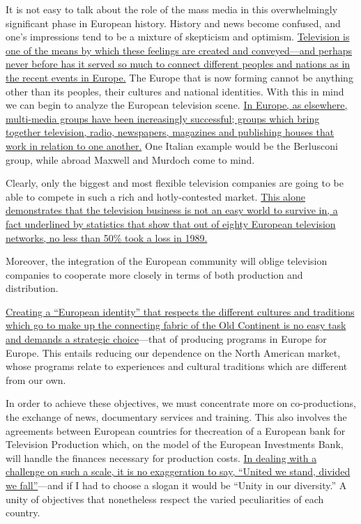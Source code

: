 {It is not easy to talk about the role of the mass media in this
overwhelmingly significant phase in European history. History and news
become confused, and one's impressions tend to be a mixture of
skepticism and optimism. \transnum \uline{Television is one of the means
	by which these feelings are created and conveyed---and perhaps never
	before has it served so much to connect different peoples and nations as
	in the recent events in Europe.} The Europe that is now forming cannot
be anything other than its peoples, their cultures and national
identities. With this in mind we can begin to analyze the European
television scene. \transnum \uline{In Europe, as elsewhere, multi-media
	groups have been increasingly successful; groups which bring together
	television, radio, newspapers, magazines and publishing houses that work
	in relation to one another.} One Italian example would be the Berlusconi
group, while abroad Maxwell and Murdoch come to mind.

Clearly, only the biggest and most flexible television companies are
going to be able to compete in such a rich and hotly-contested market.
\transnum \uline{This alone demonstrates that the television business is
	not an easy world to survive in, a fact underlined by statistics that
	show that out of eighty European television networks, no less than 50\%
	took a loss in 1989.}

Moreover, the integration of the European community will oblige
television companies to cooperate more closely in terms of both
production and distribution.

\transnum \uline{Creating a ``European identity'' that respects the
	different cultures and traditions which go to make up the connecting
	fabric of the Old Continent is no easy task and demands a strategic
	choice}---that of producing programs in Europe for Europe. This entails
reducing our dependence on the North American market, whose programs
relate to experiences and cultural traditions which are different from
our own.

In order to achieve these objectives, we must concentrate more on
co-productions, the exchange of news, documentary services and training.
This also involves the agreements between European countries for
thecreation of a European bank for Television Production which, on the
model of the European Investments Bank, will handle the finances
necessary for production costs. \transnum \uline{In dealing with a
	challenge on such a scale, it is no exaggeration to say, ``United we
	stand, divided we fall''}---and if I had to choose a slogan it would be
``Unity in our diversity.'' A unity of objectives that nonetheless
respect the varied peculiarities of each country.



}
